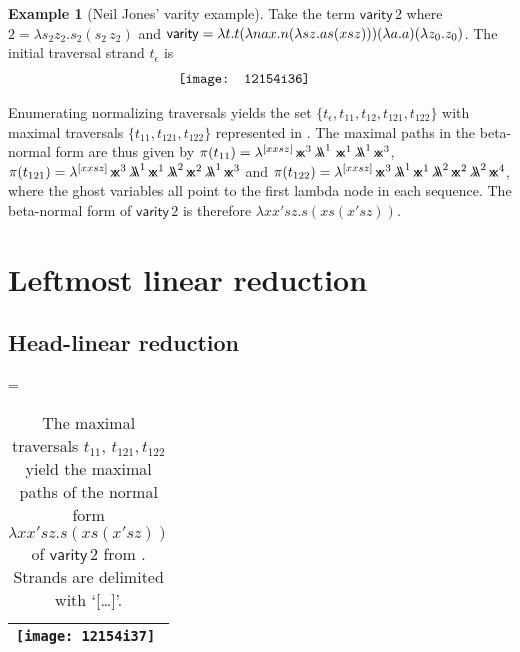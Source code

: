\documentclass[xchauthor,chkrefs,GCNS,amsmath,amsthm,rotating,leaveRGB]{tcsg}
\theoremstyle{plain}
\theoremstyle{definition}
\newtheorem{example}{Example}[section]
\def\coresymbol{\pi}
\newcommand{\core}[1]{\coresymbol(#1)}
\newcommand{\ghostlmd}{{\lambda\mkern-7mu \lambda}}
\newcommand{\ghostvar}{\mathsf{x\mkern-5mu x}}
\begin{document}
\begin{example}[Neil Jones' varity example]\label{example:varity}
Take the term $\mathsf{varity}\, 2$ where $2 = \lambda s_{2} z_{2} . s_{2}
(s_{2}\, z_{2})$ and $\mathsf{varity} = \lambda t.t (\lambda n a x . n
(\lambda s z . a s (x s z)))\break (\lambda a. a) (\lambda z_{0} . z_{0})$. The
initial traversal strand $t_\epsilon $ is
%
\begin{eqnarray*}
\hspace{-0.8cm}\texttt{[image: 12154i36]}
\end{eqnarray*}

Enumerating normalizing traversals yields the set $\{t_\epsilon , t_{11},
t_{12}, t_{121}, t_{122} \}$ with maximal traversals $\{ t_{11}, t_{121},
t_{122} \}$ represented in . The
maximal paths in the beta-normal form are thus given by $\core{t_{11}} =
\lambda ^{[x x s z]} \,\ghostvar ^{3}\,\ghostlmd ^{1}\ \ghostvar
^{1}\,\ghostlmd ^{1}\,\ghostvar ^{3} $, $\core{t_{121}} = \lambda ^{[x x s
z]} \,\ghostvar ^{3}\,\ghostlmd ^{1}\,\ghostvar ^{1}\,\ghostlmd
^{2}\,\ghostvar ^{2}\,\ghostlmd ^{1}\,\ghostvar ^{3}$ and $\core{t_{122}} =
\lambda ^{[x x s z]} \,\ghostvar ^{3}\,\ghostlmd ^{1}\,\ghostvar
^{1}\,\ghostlmd ^{2}\,\ghostvar ^{2}\,\ghostlmd ^{2}\,\ghostvar ^{4}$, where
the ghost variables all point to the first lambda node in each sequence. The
beta-normal form of $\mathsf{varity}\, 2$ is therefore $\lambda x x' s z . s
(x s (x' s z))$.
\end{example}



\section{Leftmost linear reduction}\label{sec:leftmostlinearred}



\subsection{Head-linear reduction}\label{sec6.1}

\begin{sidewaystable}[p]
\tablewidth=\textheight%
\caption{The maximal traversals $t_{11}$, $t_{121}, t_{122}$ yield the
maximal paths of the normal form $\lambda x x' s z . s (x s (x' s z))$ of
$\mathsf{varity}\,2$ from . Strands are
delimited with `[\ldots]'.}\label{tab:varity2_trav}
\begin{tabular*}{\tablewidth}{l}
\hline
\texttt{[image: 12154i37]}\\
\hline
\end{tabular*}
\end{sidewaystable}
\end{document}
